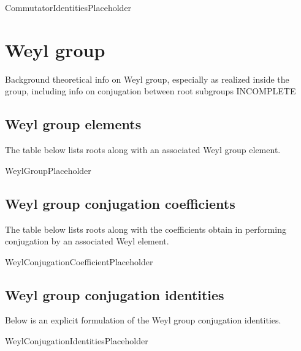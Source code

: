 \documentclass[11pt]{article}
\newcommand{\noi}{\noindent}
\theoremstyle{definition}
\begin{document}
CommutatorIdentitiesPlaceholder

\newpage
\section{Weyl group}

\noi Background theoretical info on Weyl group, especially as realized inside the group, including info on conjugation between root subgroups INCOMPLETE

\subsection{Weyl group elements}

\noi The table below lists roots along with an associated Weyl group element.

WeylGroupPlaceholder

\subsection{Weyl group conjugation coefficients}

\noi The table below lists roots along with the coefficients obtain in performing conjugation by an associated Weyl element.

WeylConjugationCoefficientPlaceholder

\subsection{Weyl group conjugation identities}

\noi Below is an explicit formulation of the Weyl group conjugation identities.

WeylConjugationIdentitiesPlaceholder
\end{document}
